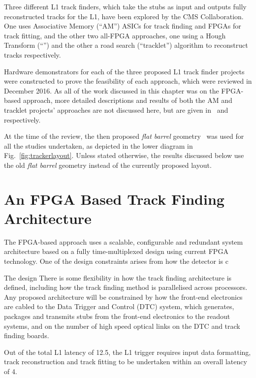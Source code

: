 Three different L1 track finders, which take the stubs as input and outputs fully reconstructed tracks for the L1, have been explored by the CMS Collaboration.
One uses Associative Memory (``AM'') ASICs for track finding and FPGAs for track fitting, and the other two all-FPGA approaches, one using a Hough Transform (``\HT'') and the other a road search (``tracklet'') algorithm to reconstruct tracks respectively.

Hardware demonstrators for each of the three proposed L1 track finder projects were constructed to prove the feasibility of each approach, which were reviewed in December 2016.
As all of the work discussed in this chapter was on the FPGA-based \HT approach, more detailed descriptions and results of both the AM and tracklet projects' approaches are not discussed here, but are given in~\cite{AM,P2TrackerTDR} and~\cite{tracklet,P2TrackerTDR} respectively.

At the time of the review, the then proposed \emph{flat barrel} geometry~\cite{CMS_Upgrade_TP} was used for all the studies undertaken, as depicted in the lower diagram in Fig.~\ref{fig:trackerlayout}.
Unless stated otherwise, the results discussed below use the old \emph{flat barrel} geometry instead of the currently proposed layout.

\section{An FPGA Based Track Finding Architecture}

The FPGA-based \HT approach uses a scalable, configurable and redundant system architecture based on a fully time-multiplexed design using current FPGA technology.
One of the design constraints arises from how the detector is c

The design 
There is some flexibility in how the track finding architecture is defined, including how the track finding method is parallelised across processors.
Any proposed architecture will be constrained by
 how the front-end electronics are cabled to the Data Trigger and Control (DTC) system, which generates, packages and transmits stubs from the front-end electronics to the readout systems, and on the number of high speed optical links on the DTC and track finding boards.

Out of the total L1 latency of 12.5\mus, the L1 trigger requires input data formatting, track reconstruction and track fitting to be undertaken within an overall latency of 4\mus.

